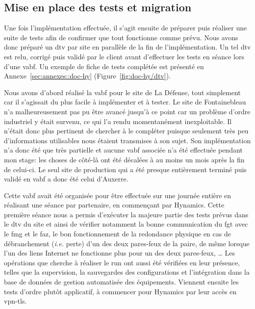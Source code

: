 \documentclass[12pt, oneside, a4paper, titlepage]{report}
\begin{document}
\FloatBarrier{}
\subsection{Mise en place des tests et migration}%
\label{sub:mission::main::tests}

Une fois l'implémentation effectuée, il s'agit ensuite de préparer puis réaliser
une suite de tests afin de confirmer que tout fonctionne comme prévu. Nous avons
donc préparé un \acrfull{dtv} par site en parallèle de la fin de
l'implémentation. Un tel \gls{dtv} est relu, corrigé puis validé par le client
avant d'effectuer les tests en séance lors d'une \acrfull{vabf}. Un exemple de
fiche de tests complétée est présenté en Annexe~\ref{sec:annexes::doc-hy}
(Figure~\ref{fig:doc-hy/dtv}).

Nous avons d'abord réalisé la \gls{vabf} pour le site de La Défense, tout
simplement car il s'agissait du plus facile à implémenter et à tester. Le site
de Fontainebleau n'a malheureusement pas pu être avancé jusqu'à ce point car un
problème d'ordre industriel y était survenu, ce qui l'a rendu momentanément
inexploitable. Il n'était donc plus pertinent de chercher à le compléter puisque
seulement très peu d'informations utilisables nous étaient transmises à son
sujet. Son implémentation n'a donc été que très partielle et aucune \gls{vabf}
associée n'a été effectuée pendant mon stage: les choses de côté-là ont été
décalées à au moins un mois après la fin de celui-ci. Le seul site de production
qui a été presque entièrement terminé puis validé en \gls{vabf} a donc été celui
d'Auxerre.

Cette \gls{vabf} avait été organisée pour être effectuée sur une journée entière
en réalisant une séance par partenaire, en commençant par Hynamics. Cette
première séance nous a permis d'exécuter la majeure partie des tests prévus dans
le \gls{dtv} du site et ainsi de vérifier notamment la bonne communication du
\acrlong{fgt} avec le \acrlong{fmg} et le \acrlong{faz}, le bon fonctionnement
de la redondance physique en cas de débranchement (\textit{i.e.} perte) d'un des
deux pares-feux de la paire, de même lorsque l'un des liens Internet ne
fonctionne plus pour un des deux pares-feux, \ldots{} Les opérations que cherche
à réaliser le \gls{run} ont aussi été vérifiées en leur présence, telles que la
supervision, la sauvegardes des configurations et l'intégration dans la base de
données de gestion automatisée des équipements. Viennent ensuite les tests
d'ordre plutôt applicatif, à commencer pour Hynamics par leur accès en
\gls{vpn-tls}.
\end{document}
